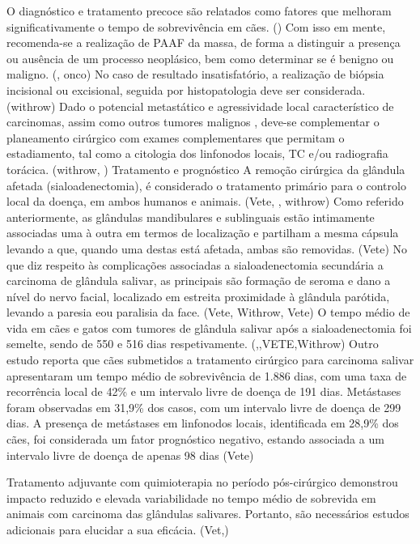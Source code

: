 O diagnóstico e tratamento precoce são relatados como fatores que melhoram significativamente o tempo de sobrevivência em cães. (\cite{Dobson2011}) Com isso em mente, recomenda-se a realização de PAAF da massa, de forma a distinguir a presença ou ausência de um processo neoplásico, bem como determinar se é benigno ou maligno. (\cite{Dobson2011}, onco) No caso de resultado insatisfatório, a realização de biópsia incisional ou excisional, seguida por histopatologia deve ser considerada. (withrow) Dado o potencial metastático e agressividade local característico de carcinomas, assim como outros tumores malignos , deve-se complementar o planeamento cirúrgico com exames complementares que permitam o estadiamento, tal como a citologia dos linfonodos locais, TC e/ou radiografia torácica. (withrow, \cite{Dobson2011})
Tratamento e prognóstico
A remoção cirúrgica da glândula afetada (sialoadenectomia), é considerado o tratamento primário para o controlo local da doença, em ambos humanos e animais. (Vete, \cite{Dobson2011}, withrow) Como referido anteriormente, as glândulas mandibulares e sublinguais estão intimamente associadas uma à outra em termos de localização e partilham a mesma cápsula levando a que, quando uma destas está afetada, ambas são removidas. (Vete) 
No que diz respeito às complicações associadas a sialoadenectomia secundária a carcinoma de glândula salivar, as principais são formação de seroma e dano a nível do nervo facial, localizado em estreita proximidade à glândula parótida, levando a paresia eou paralisia da face. (Vete, Withrow, Vete)
O tempo médio de vida em cães e gatos com tumores de glândula salivar após a sialoadenectomia foi semel\cite{Han2016}te, sendo de 550 e 516 dias respetivamente.  (\cite{Hammer2001},\cite{Dobson2011},VETE,Withrow) Outro estudo reporta que cães submetidos a tratamento cirúrgico para carcinoma salivar apresentaram um tempo médio de sobrevivência de 1.886 dias, com uma taxa de recorrência local de 42\% e um intervalo livre de doença de 191 dias. Metástases foram observadas em 31,9\% dos casos, com um intervalo livre de doença de 299 dias. A presença de metástases em linfonodos locais, identificada em 28,9\% dos cães, foi considerada um fator prognóstico negativo, estando associada a um intervalo livre de doença de apenas 98 dias (Vete)


Tratamento adjuvante com quimioterapia no período pós-cirúrgico demonstrou impacto reduzido e elevada variabilidade no tempo médio de sobrevida em animais com carcinoma das glândulas salivares. Portanto, são necessários estudos adicionais para elucidar a sua eficácia. (Vet,\cite{Hammer2001})

